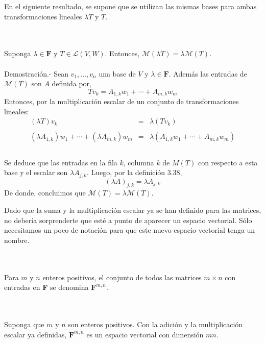 En el siguiente resultado, se supone que se utilizan las mismas bases para ambas transformaciones lineales $\lambda T$ y $T$.

\begin{myteo}\;\\\\
    Suponga $\lambda \in \textbf{F}$ y $T\in \mathcal{L}(V,W)$. Entonces, $\mathcal{M}(\lambda T)=\lambda \mathcal{M}(T)$.\\\\
	Demostración.-\; Sean $v_1,\ldots, v_n$ una base de $V$ y $\lambda \in \textbf{F}$. Además las entradas de $\mathcal{M}(T)$ son $A$ definida por,
	$$Tv_k=A_{1,k}w_1+\cdots+A_{m,k}w_m$$
	Entonces, por la multiplicación escalar de un conjunto de transformaciones lineales:
	$$
	\begin{array}{rcl}
	(\lambda T)v_k&=& \lambda(Tv_k)\\\\
	\left(\lambda A_{1,k}\right)w_1 + \cdots +\left(\lambda A_{m,k}\right) w_m &=&\lambda\left(A_{1,k}w_1+\cdots +A_{m,k}w_m\right)\\\\
	\end{array}
	$$

	Se deduce que las entradas en la fila $k$, columna $k$ de $M(T)$ con respecto a esta base y el escalar son $\lambda A_{j,k}$. Luego, por la definición 3.38, 
	$$(\lambda A)_{j,k}=\lambda A_{j,k}$$
	De donde, concluimos que $\mathcal{M}(T) =  \lambda \mathcal{M}(T)$.
\end{myteo}

Dado que la suma y la multiplicación escalar ya se han definido para las matrices, no debería sorprenderte que esté a punto de aparecer un espacio vectorial. Sólo necesitamos un poco de notación para que este nuevo espacio vectorial tenga un nombre.

\begin{mydef}\;\\\\
    Para $m$ y $n$ enteros positivos, el conjunto de todos las matrices $m\times n$ con entradas en \textbf{F} se denomina $\textbf{F}^{m,n}$.
\end{mydef}

\begin{myteo}[\boldmath $\dim \textbf{F}^{m,n}=mn$]\,\\\\
    Suponga que $m$ y $n$ son enteros positivos. Con la adición y la multiplicación escalar ya definidas, $\textbf{F}^{m,n}$ es un espacio vectorial con dimensión $mn$.
\end{myteo}

